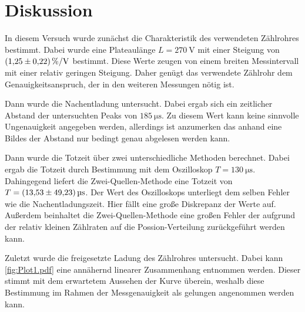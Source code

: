 \section{Diskussion}
\label{sec:Diskussion}
In diesem Versuch wurde zunächst die Charakteristik des verwendeten Zählrohres bestimmt. Dabei wurde eine Plateaulänge $L = \qty{270}{\volt}$ mit einer Steigung von 
$\qty{1.25+-0.22}{\percent\per\volt}$ bestimmt. Diese Werte zeugen von einem breiten Messintervall mit einer relativ geringen Steigung. Daher genügt das verwendete 
Zählrohr dem Genauigkeitsanspruch, der in den weiteren Messungen nötig ist.

Dann wurde die Nachentladung untersucht. Dabei ergab sich ein zeitlicher Abstand der untersuchten Peaks von $\qty{185}{\micro\second}$. Zu diesem Wert kann keine sinnvolle
Ungenauigkeit angegeben werden, allerdings ist anzumerken das anhand eine Bildes der Abstand nur bedingt genau abgelesen werden kann.  

Dann wurde die Totzeit über zwei unterschiedliche Methoden berechnet. Dabei ergab die Totzeit durch Bestimmung mit dem Oszilloskop $T = \qty{130}{\micro\second}$. Dahingegend
liefert die Zwei-Quellen-Methode eine Totzeit von $T = \qty{13.53 +-49.23}{\micro\second}$. Der Wert des Oszilloskops unterliegt dem selben Fehler wie die Nachentladungszeit.
Hier fällt eine große Diskrepanz der Werte auf. Außerdem beinhaltet die Zwei-Quellen-Methode eine großen Fehler der aufgrund der relativ kleinen Zählraten auf die 
Possion-Verteilung zurückgeführt werden kann.

Zuletzt wurde die freigesetzte Ladung des Zählrohres untersucht. Dabei kann \autoref{fig:Plot1.pdf} eine annähernd linearer Zusammenhang entnommen werden. Dieser stimmt mit 
dem erwartetem Aussehen der Kurve überein, weshalb diese Bestimmung im Rahmen der Messgenauigkeit als gelungen angenommen werden kann.